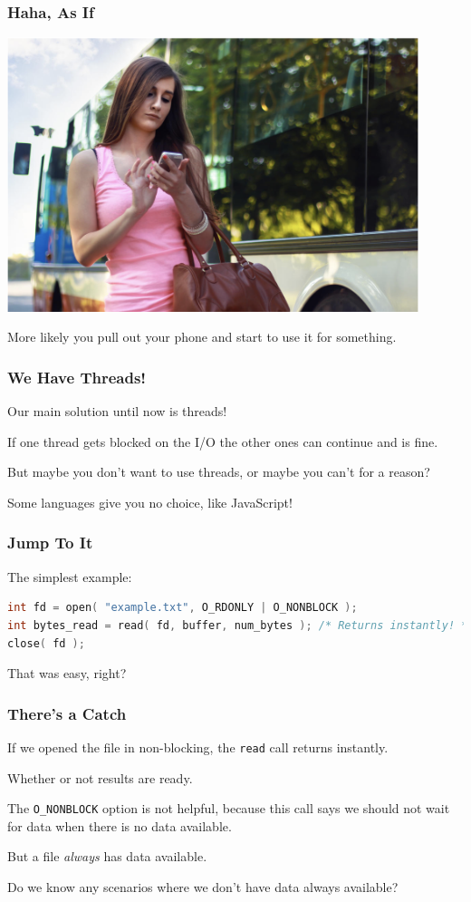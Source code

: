 \begin{frame}
	\frametitle{Haha, As If}

	\begin{center}
		\includegraphics[width=0.9\textwidth]{images/textbus.png}
	\end{center}

	More likely you pull out your phone and start to use it for something.

\end{frame}

\begin{frame}
	\frametitle{We Have Threads!}

	Our main solution until now is threads!

	If one thread gets blocked on the I/O the other ones can continue and is fine.

	But maybe you don't want to use threads, or maybe you can't for a reason?

	Some languages give you no choice, like JavaScript!

\end{frame}


\begin{frame}[fragile]
	\frametitle{Jump To It}

	The simplest example:

	\begin{lstlisting}[language=C]
int fd = open( "example.txt", O_RDONLY | O_NONBLOCK );
int bytes_read = read( fd, buffer, num_bytes ); /* Returns instantly! */
close( fd );
\end{lstlisting}

	That was easy, right?

\end{frame}


\begin{frame}
	\frametitle{There's a Catch}

	If we opened the file in non-blocking, the \texttt{read} call returns instantly.

	Whether or not results are ready.

	The \texttt{O\_NONBLOCK} option is not helpful, because this call says we should not wait for data when there is no data available.

	But a file \textit{always} has data available.

	Do we know any scenarios where we don't have data always available?

\end{frame}


